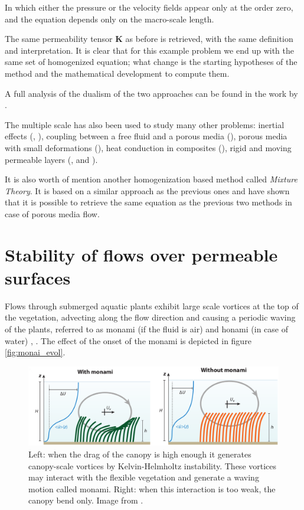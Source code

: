In which either the pressure or the velocity fields appear only at the order zero, and the equation depends only on the macro-scale length.

The same permeability tensor $\mathbf{K}$ as before is retrieved, with the same definition and interpretation.
It is clear that for this example problem we end up with the same set of homogenized equation; what change is the starting hypotheses of the method and the mathematical development to compute them.

A full analysis of the dualism of the two approaches can be found in the work by \citet{davit2013homogenization}.

The multiple scale has also been used to study many other problems: inertial effects (\citet{mei1991effect}, \citet{skjetne1999new}), coupling between a free fluid and a porous media (\citet{mikelic2000interface}), porous media with small deformations (\citet{auriault1977etude}), heat conduction in composites (\citet{auriault1983effective}), rigid and moving permeable layers (\citet{zampogna2016fluid}, \citet{ugis} and \citet{zampogna2017pelskin}).

It is also worth of mention another homogenization based method called \textit{Mixture Theory}.
It is based on a similar approach as the previous ones and  \citet{rajagopal2007hierarchy} have shown that it is possible to retrieve the same equation as the previous two methods in case of porous media flow.


\section{Stability of flows over permeable surfaces}
\label{sec:stability}

Flows through submerged aquatic plants exhibit large scale vortices at the top of the vegetation,
advecting along the flow direction and causing a periodic waving of the plants, referred to as
monami (if the fluid is air) and honami (in case of water) \citet{inoue1955studies}, \citet{ackerman1993reduced}.
The effect of the onset of the monami is depicted in figure \ref{fig:monai_evol}.

\begin{figure}[h]
	\centering
	\includegraphics[width=1\linewidth]{chapter_1/monami}
	\caption{Left: when the drag of the canopy is high enough it generates canopy-scale vortices by Kelvin-Helmholtz instability. These vortices may interact with the flexible vegetation and generate a waving motion called monami. Right: when this interaction is too weak, the canopy bend only. Image from \citet{nepf2012flow}.}
	\label{fig:monami}
\end{figure}

